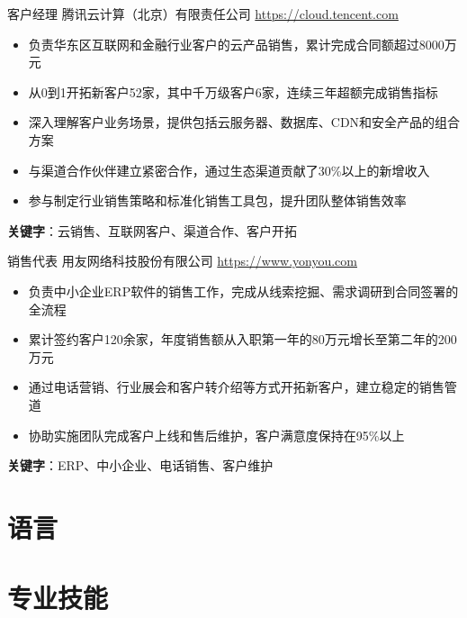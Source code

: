 \documentclass[a4paper, serif, 10pt]{moderncv}
\begin{document}
        {客户经理}
        {腾讯云计算（北京）有限责任公司}
        {\url{https://cloud.tencent.com}}
        {}
        {\begin{itemize}
\item 负责华东区互联网和金融行业客户的云产品销售，累计完成合同额超过8000万元
\item 从0到1开拓新客户52家，其中千万级客户6家，连续三年超额完成销售指标
\item 深入理解客户业务场景，提供包括云服务器、数据库、CDN和安全产品的组合方案
\item 与渠道合作伙伴建立紧密合作，通过生态渠道贡献了30\%以上的新增收入
\item 参与制定行业销售策略和标准化销售工具包，提升团队整体销售效率
\end{itemize}
\textbf{关键字}：云销售、互联网客户、渠道合作、客户开拓}

        {销售代表}
        {用友网络科技股份有限公司}
        {\url{https://www.yonyou.com}}
        {}
        {\begin{itemize}
\item 负责中小企业ERP软件的销售工作，完成从线索挖掘、需求调研到合同签署的全流程
\item 累计签约客户120余家，年度销售额从入职第一年的80万元增长至第二年的200万元
\item 通过电话营销、行业展会和客户转介绍等方式开拓新客户，建立稳定的销售管道
\item 协助实施团队完成客户上线和售后维护，客户满意度保持在95\%以上
\end{itemize}
\textbf{关键字}：ERP、中小企业、电话销售、客户维护}
\section{语言}

\section{专业技能}

\end{document}
